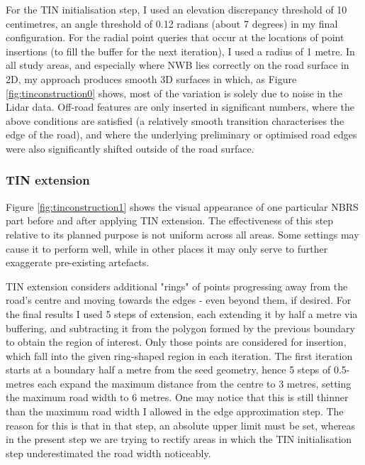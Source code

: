 For the TIN initialisation step, I used an elevation discrepancy threshold of 10 centimetres, an angle threshold of 0.12 radians (about 7 degrees) in my final configuration. For the radial point queries that occur at the locations of point insertions (to fill the buffer for the next iteration), I used a radius of 1 metre. In all study areas, and especially where NWB lies correctly on the road surface in 2D, my approach produces smooth 3D surfaces in which, as Figure \ref{fig:tinconstruction0} shows, most of the variation is solely due to noise in the Lidar data. Off-road features are only inserted in significant numbers, where the above conditions are satisfied (a relatively smooth transition characterises the edge of the road), and where the underlying preliminary or optimised road edges were also significantly shifted outside of the road surface.

\subsubsection{TIN extension}

Figure \ref{fig:tinconstruction1} shows the visual appearance of one particular NBRS part before and after applying TIN extension. The effectiveness of this step relative to its planned purpose is not uniform across all areas. Some settings may cause it to perform well, while in other places it may only serve to further exaggerate pre-existing artefacts.

TIN extension considers additional "rings" of points progressing away from the road's centre and moving towards the edges - even beyond them, if desired. For the final results I used 5 steps of extension, each extending it by half a metre via buffering, and subtracting it from the polygon formed by the previous boundary to obtain the region of interest. Only those points are considered for insertion, which fall into the given ring-shaped region in each iteration. The first iteration starts at a boundary half a metre from the seed geometry, hence 5 steps of 0.5-metres each expand the maximum distance from the centre to 3 metres, setting the maximum road width to 6 metres. One may notice that this is still thinner than the maximum road width I allowed in the edge approximation step. The reason for this is that in that step, an absolute upper limit must be set, whereas in the present step we are trying to rectify areas in which the TIN initialisation step underestimated the road width noticeably.


